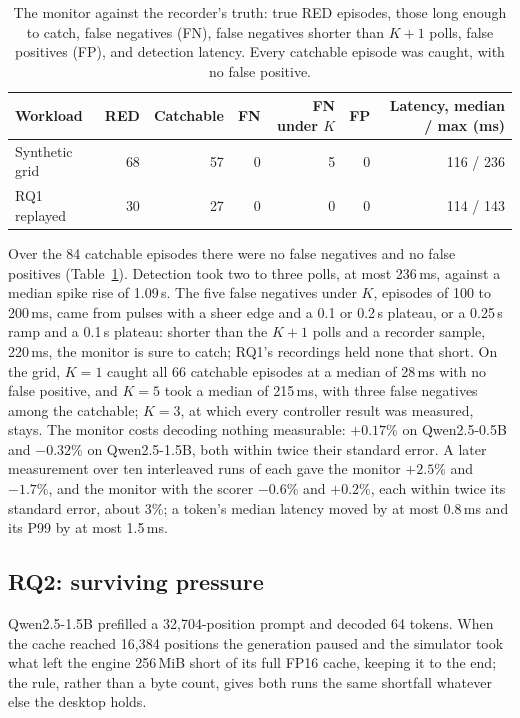 \documentclass{article}
\begin{document}
\begin{table}[t]
\caption{The monitor against the recorder's truth: true RED episodes, those long
enough to catch, false negatives (FN), false negatives shorter than $K+1$
polls, false positives (FP), and detection latency. Every catchable episode was
caught, with no false positive.}
\label{tab:detection}
\centering
\small
\begin{tabular}{lrrrrrr}
\toprule
Workload & RED & Catchable & FN & FN under $K$ & FP & Latency, median / max (ms) \\
\midrule
Synthetic grid & 68 & 57 & 0 & 5 & 0 & 116 / 236 \\
RQ1 replayed & 30 & 27 & 0 & 0 & 0 & 114 / 143 \\
\bottomrule
\end{tabular}
\end{table}

Over the 84 catchable episodes there were no false negatives and no false
positives (Table~\ref{tab:detection}). Detection took two to three polls, at
most 236\,ms, against a median spike rise of 1.09\,s. The five false negatives
under $K$, episodes of 100 to 200\,ms, came from pulses with a sheer edge and a
0.1 or 0.2\,s plateau, or a 0.25\,s ramp and a 0.1\,s plateau: shorter than
the $K + 1$ polls and a recorder sample, 220\,ms, the monitor is sure to catch;
RQ1's recordings held none that short. On the grid, $K = 1$ caught all 66
catchable episodes at a median of 28\,ms with no false positive, and $K = 5$
took a median of 215\,ms, with three false negatives among the catchable;
$K = 3$, at which every controller result was measured, stays. The
monitor costs decoding nothing measurable: $+0.17\%$ on Qwen2.5-0.5B and
$-0.32\%$ on Qwen2.5-1.5B, both within twice their standard error. A later
measurement over ten interleaved runs of each gave the monitor $+2.5\%$ and
$-1.7\%$, and the monitor with the scorer $-0.6\%$ and $+0.2\%$, each within
twice its standard error, about 3\%; a token's median latency moved by at most
0.8\,ms and its P99 by at most 1.5\,ms.

\subsection{RQ2: surviving pressure}
\label{sec:survival}

Qwen2.5-1.5B prefilled a 32{,}704-position prompt and decoded 64 tokens. When
the cache reached 16{,}384 positions the generation paused and the simulator
took what left the engine 256\,MiB short of its full FP16 cache, keeping it to
the end; the rule, rather than a byte count, gives both runs the same shortfall
whatever else the desktop holds.
\end{document}

